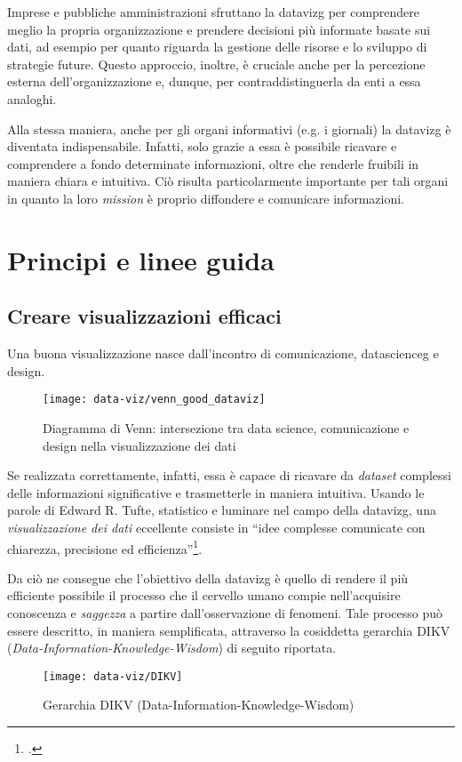 Imprese e pubbliche amministrazioni sfruttano la \gls{datavizg} per comprendere meglio la propria organizzazione e 
prendere decisioni più informate basate sui dati, ad esempio per quanto riguarda la gestione delle risorse e lo sviluppo di strategie future. 
Questo approccio, inoltre, è cruciale anche per la percezione esterna dell'organizzazione e, dunque, per contraddistinguerla da enti a essa analoghi.

Alla stessa maniera, anche per gli organi informativi (e.g. i giornali) la \gls{datavizg} è diventata indispensabile. 
Infatti, solo grazie a essa è possibile ricavare e comprendere a fondo determinate informazioni, oltre che renderle fruibili 
in maniera chiara e intuitiva. Ciò risulta particolarmente importante per tali organi in quanto la loro \emph{mission} è proprio diffondere 
e comunicare informazioni.



\section{Principi e linee guida}
\subsection{Creare visualizzazioni efficaci}
Una buona visualizzazione nasce dall'incontro di comunicazione, \gls{datascienceg} e design.
\begin{figure}[H] 
    \centering 
    \texttt{[image: data-viz/venn\_good\_dataviz]} 
    \caption{Diagramma di Venn: intersezione tra data science, comunicazione e design nella visualizzazione dei dati}
    \label{fig:venn_good_dataviz}
\end{figure}

\noindent Se realizzata correttamente, infatti, essa è capace di ricavare da \emph{dataset} complessi delle informazioni significative e trasmetterle in maniera intuitiva.
Usando le parole di Edward R. Tufte, statistico e luminare nel campo della \gls{datavizg}, una \emph{visualizzazione dei dati} eccellente consiste in
``idee complesse comunicate con chiarezza, precisione ed efficienza''\footcite{tufte:vis_display}.

Da ciò ne consegue che l'obiettivo della \gls{datavizg} è quello di rendere il più efficiente possibile il processo che il cervello
umano compie nell'acquisire conoscenza e \emph{saggezza} a partire dall'osservazione di fenomeni.
Tale processo può essere descritto, in maniera semplificata, attraverso la cosiddetta gerarchia DIKV (\emph{Data-Information-Knowledge-Wisdom}) di seguito riportata.
\begin{figure}[H] 
    \centering 
    \texttt{[image: data-viz/DIKV]} 
    \caption{Gerarchia DIKV (Data-Information-Knowledge-Wisdom)}
    \label{fig:DIKV}
\end{figure}

